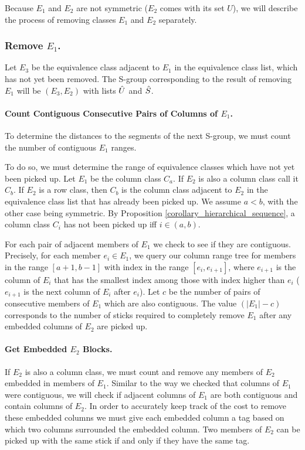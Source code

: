 Because $E_1$ and $E_2$ are not symmetric ($E_2$ comes with its set $U$), we will describe the process of removing classes $E_1$ and $E_2$ separately.


\subsubsection{Remove $E_1$.}
Let $E_3$ be the equivalence class adjacent to $E_1$ in the equivalence class list, which has not yet been removed.
The S-group corresponding to the result of removing $E_1$ will be $(E_3,E_2)$
with lists $\hat{U}$ and $\hat{S}$.

\paragraph{Count Contiguous Consecutive Pairs of Columns of $E_1$.}
To determine the distances to the segments of the next S-group,
we must count the number of contiguous $E_1$ ranges.

To do so, we must determine the range of equivalence classes which have not yet been picked up.
Let $E_1$ be the column class $C_a$.
If $E_2$ is also a column class call it $C_b$.
If $E_2$ is a row class, then $C_b$ is the column class adjacent to $E_2$ in the equivalence class list that has already been picked up.
We assume $a<b$, with the other case being symmetric.
By Proposition \ref{corollary_hierarchical_sequence},
 a column class $C_i$ has not been picked up iff $i\in (a,b)$.


For each pair of adjacent members of $E_1$ we check to see if
they are contiguous.
Precisely, for each member $e_i \in E_1$, we query our column range tree for members in the range $[a+1,b-1]$ with index in the range $[e_i,e_{i+1}]$,
where $e_{i+1}$ is the column of $E_i$ that has the smallest index
among those with index higher than $e_i$ ($e_{i+1}$ is the next column of $E_i$
after $e_i$).
Let $c$ be the number of pairs of consecutive members of $E_1$ which are also contiguous.
The value $(|E_1| - c)$ corresponds to the number of sticks required to completely remove $E_1$ after any embedded columns of $E_2$ are picked up.

\paragraph{Get Embedded $E_2$ Blocks.}
If $E_2$ is also a column class, we must count and remove any members of $E_2$ embedded in members of $E_1$.
Similar to the way we checked that columns of $E_1$ were contiguous, we will check if adjacent columns of $E_1$ are both contiguous and contain columns of $E_2$.
In order to accurately keep track of the cost to remove these embedded columns we must give each embedded column a tag based on which two columns surrounded the embedded column.
Two members of $E_2$ can be picked up with the same stick if and only if they have the same tag.

